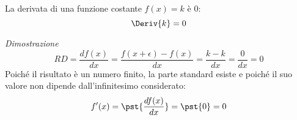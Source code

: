 \begin{teorema}
La derivata di una funzione costante \(f(x) = k\) è \(0\):
\[\Deriv{k}=0\]
\end{teorema}
\emph{Dimostrazione}
\[RD = \dfrac{df(x)}{dx} = \dfrac{f(x +\epsilon) -f(x)}{dx} =
  \dfrac{k-k}{dx} = \dfrac{0}{dx} = 0\]
Poiché il risultato è un numero finito, la parte standard esiste e 
poiché il suo valore non dipende dall'infinitesimo considerato:
\[f'(x) = \pst{\dfrac{df(x)}{dx}} = \pst{0} = 0\]
% 

% 
% 
% 

